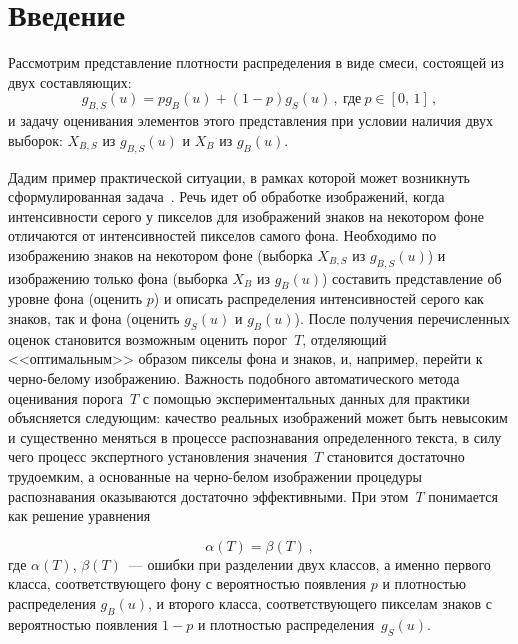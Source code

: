       \begin{multicols}{2}

      \label{st\stat}

      
\section{ Введение}
     
     Рассмотрим представление плотности распределения в виде смеси, 
состоящей из двух составляющих:
     \begin{equation}
    g_{B,S} (u) = pg_B (u) +(1-p)g_S (u)\,,\ \mbox{где}\ p\in [0,\,1]\,,
     \label{e1kr}
     \end{equation}
и задачу оценивания элементов этого представления при условии наличия двух 
выборок: $X_{B,S}$ из  $g_{B,S}(u)$ и $X_B$ из $g_B(u)$.
     
     Дадим пример практической ситуации, в рамках которой может возникнуть 
сформулированная задача~\cite{1kr}. Речь идет об обработке изображений, когда 
интенсивности серого у пикселов для изоб\-ра\-же\-ний знаков на некотором фоне 
отличаются от интенсивностей пикселов самого фона. Необходимо по 
изображению знаков на некотором фоне (выборка $X_{B,S}$ из $g_{B,S}(u)$) и 
изображению только фона (выборка $X_B$ из $g_B(u)$) составить представление 
об уровне фона (оценить $p$) и описать распределения интенсивностей серого как 
знаков, так и фона (оценить $g_S(u)$ и $g_B(u)$). После получения 
перечисленных оценок становится возможным оценить порог~$T$, отделяющий 
<<оптимальным>> образом пикселы фона и знаков, и, например, перейти к 
     черно-белому изображению. Важность подобного автоматического метода 
оценивания порога~$T$ с помощью экспериментальных данных для практики 
объясняется следующим: качество реальных изоб\-ра\-же\-ний может быть невысоким 
и существенно меняться в процессе распознавания определенного текста, в силу 
чего процесс экспертного установления значения~$T$ становится достаточно 
трудоемким, а основанные на черно-белом изображении процедуры 
распознавания оказываются достаточно эффективными. При этом~$T$ 
понимается как решение уравнения 

\noindent
$$
\alpha (T) =\beta (T)\,,
$$ 
где $\alpha (T)$, $\beta 
(T)$~--- ошибки при разделении двух классов, а именно первого класса, 
соответствующего фону с вероятностью появления $p$ и плотностью 
распределения $g_B(u)$, и второго класса, соответствующего пикселам знаков с 
вероятностью появления $1-p$ и плотностью распределения~$g_S(u)$.
     

\end{multicols}
